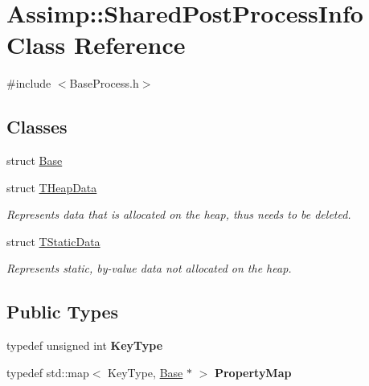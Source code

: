 \hypertarget{class_assimp_1_1_shared_post_process_info}{\section{Assimp\+:\+:Shared\+Post\+Process\+Info Class Reference}
\label{class_assimp_1_1_shared_post_process_info}
}


{\ttfamily \#include $<$Base\+Process.\+h$>$}

\subsection*{Classes}
\begin{DoxyCompactItemize}
\item 
struct \hyperlink{struct_assimp_1_1_shared_post_process_info_1_1_base}{Base}
\item 
struct \hyperlink{struct_assimp_1_1_shared_post_process_info_1_1_t_heap_data}{T\+Heap\+Data}
\begin{DoxyCompactList}\small\item\em Represents data that is allocated on the heap, thus needs to be deleted. \end{DoxyCompactList}\item 
struct \hyperlink{struct_assimp_1_1_shared_post_process_info_1_1_t_static_data}{T\+Static\+Data}
\begin{DoxyCompactList}\small\item\em Represents static, by-\/value data not allocated on the heap. \end{DoxyCompactList}\end{DoxyCompactItemize}
\subsection*{Public Types}
\begin{DoxyCompactItemize}
\item 
\hypertarget{class_assimp_1_1_shared_post_process_info_aa52493ab5a81f990d9102de06c78b8e5}{typedef unsigned int {\bfseries Key\+Type}}\label{class_assimp_1_1_shared_post_process_info_aa52493ab5a81f990d9102de06c78b8e5}

\item 
\hypertarget{class_assimp_1_1_shared_post_process_info_a9363375c67a1abc41ef50cddd5f7296b}{typedef std\+::map$<$ Key\+Type, \hyperlink{struct_assimp_1_1_shared_post_process_info_1_1_base}{Base} $\ast$ $>$ {\bfseries Property\+Map}}\label{class_assimp_1_1_shared_post_process_info_a9363375c67a1abc41ef50cddd5f7296b}

\end{DoxyCompactItemize}
